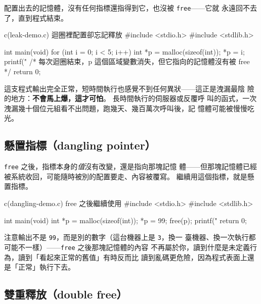 配置出去的記憶體，沒有任何指標還指得到它，也沒被 \texttt{free}——它就
永遠回不去了，直到程式結束。

\begin{example}{c}{(leak-demo.c) 迴圈裡配置卻忘記釋放}
#include <stdio.h>
#include <stdlib.h>

int main(void) {
    for (int i = 0; i < 5; i++) {
        int *p = malloc(sizeof(int));
        *p = i;
        printf("%
    } /* 每次迴圈結束，p 這個區域變數消失，但它指向的記憶體沒有被 free */
    return 0;
}
\end{example}


這支程式輸出完全正常，短時間執行也感覺不到任何異狀——這正是洩漏最陰
險的地方：\textbf{不會馬上爆，這才可怕}。 長時間執行的伺服器或反覆呼
叫的函式，一次洩漏幾十個位元組看不出問題，跑幾天、幾百萬次呼叫後，記
憶體可能被慢慢吃光。

\subsection{懸置指標（dangling pointer）}

\texttt{free} 之後，指標本身的\textit{值}沒有改變，還是指向那塊記憶
體——但那塊記憶體已經被系統收回，可能隨時被別的配置要走、內容被覆寫。
繼續用這個指標，就是懸置指標。

\begin{example}{c}{(dangling-demo.c) free 之後繼續使用}
#include <stdio.h>
#include <stdlib.h>

int main(void) {
    int *p = malloc(sizeof(int));
    *p = 99;
    free(p);
    printf("%
    return 0;
}
\end{example}


注意輸出不是 \texttt{99}，而是別的數字（這台機器上是 \texttt{3}，換一
臺機器、換一次執行都可能不一樣）——\texttt{free} 之後那塊記憶體的內容
不再屬於你，讀到什麼是未定義行為，讀到「看起來正常的舊值」有時反而比
讀到亂碼更危險，因為程式表面上還是「正常」執行下去。

\subsection{雙重釋放（double free）}

